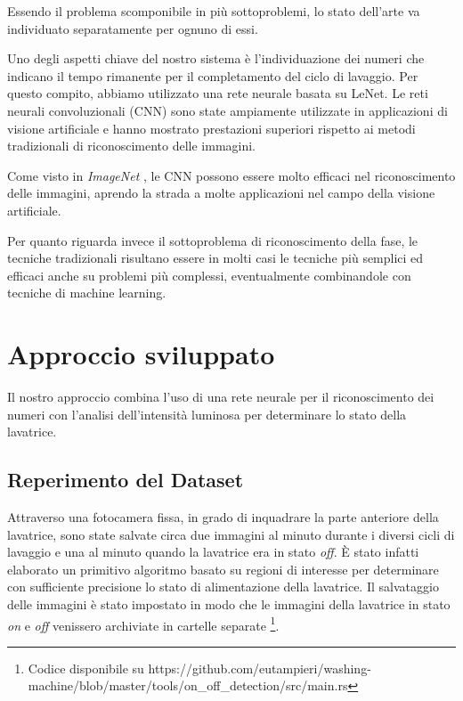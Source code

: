 \documentclass{article}
\begin{document}
\par Essendo il problema scomponibile in più sottoproblemi, lo stato
dell'arte va individuato separatamente per ognuno di essi.

\par Uno degli aspetti chiave del nostro sistema è l'individuazione dei
numeri che indicano il tempo rimanente per il completamento del ciclo di
lavaggio. Per questo compito, abbiamo utilizzato una rete neurale basata
su LeNet\citep{lecun2015lenet}. Le reti neurali convoluzionali (CNN) sono state ampiamente
utilizzate in applicazioni di visione artificiale e hanno mostrato
prestazioni superiori rispetto ai metodi tradizionali di riconoscimento
delle immagini.

\par Come visto in \textit{ImageNet} \citep{krizhevsky2012imagenet},
le CNN possono essere molto efficaci nel riconoscimento
delle immagini, aprendo la strada a molte applicazioni nel campo della
visione artificiale.

\par Per quanto riguarda invece il sottoproblema di riconoscimento della
fase, le tecniche tradizionali risultano essere in molti casi le
tecniche più semplici ed efficaci anche su problemi più complessi, eventualmente combinandole con tecniche di machine learning\citep{o2020deep}.

\section{Approccio sviluppato}\label{approccio-sviluppato}

\par Il nostro approccio combina l'uso di una rete neurale per il
riconoscimento dei numeri con l'analisi dell'intensità luminosa per
determinare lo stato della lavatrice.

\subsection{Reperimento del Dataset}\label{reperimento-del-dataset}

\par Attraverso una fotocamera fissa, in grado di inquadrare la parte
anteriore della lavatrice, sono state salvate circa due immagini al
minuto durante i diversi cicli di lavaggio e una al minuto quando la
lavatrice era in stato \textit{off}. È stato infatti elaborato un primitivo
algoritmo basato su regioni di interesse per determinare con sufficiente
precisione lo stato di alimentazione della lavatrice. Il salvataggio
delle immagini è stato impostato in modo che le immagini della lavatrice
in stato \textit{on} e \textit{off} venissero archiviate in cartelle separate
\footnote{Codice disponibile su https://github.com/eutampieri/washing-machine/blob/master/tools/on\_off\_detection/src/main.rs}.
\end{document}
